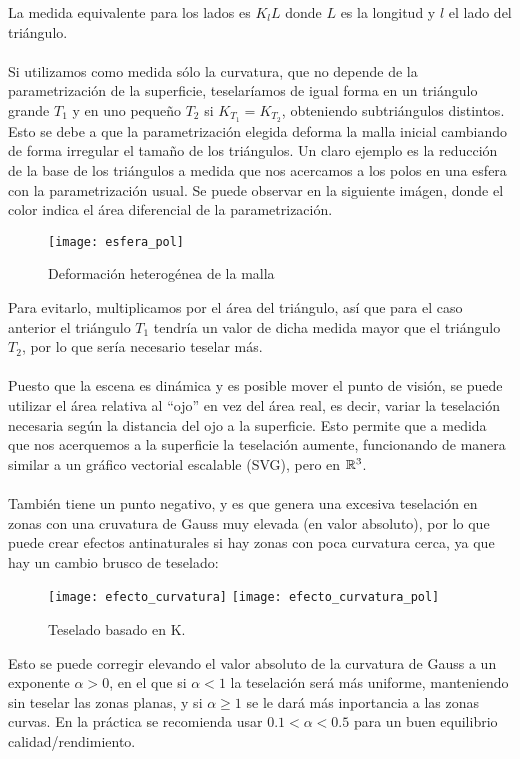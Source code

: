 	La medida equivalente para los lados es $K_l L$ donde $L$ es la longitud y $l$ el lado del triángulo.\\
	\\Si utilizamos como medida sólo la curvatura, que no depende de la parametrización de la superficie, teselaríamos de igual forma en un triángulo grande $T_1$ y en uno pequeño $T_2$ si $K_{T_1}=K_{T_2}$, obteniendo subtriángulos distintos. Esto se debe a que la parametrización elegida deforma la malla inicial cambiando de forma irregular el tamaño de los triángulos. Un claro ejemplo es la reducción de la base de los triángulos a medida que nos acercamos a los polos en una esfera con la parametrización usual. Se puede observar en la siguiente imágen, donde el color indica el área diferencial de la parametrización.\\
	\begin{figure}[h]
  		\centering
  		\texttt{[image: esfera\_pol]}
  		\caption{Deformación heterogénea de la malla}
  		\label{fig:esfera_pol}
	\end{figure}
	\newpage
	Para evitarlo, multiplicamos por el área del triángulo, así que para el caso anterior el triángulo $T_1$ tendría un valor de dicha medida mayor que el triángulo $T_2$, por lo que sería necesario teselar más.\\
	\\Puesto que la escena es dinámica y es posible mover el punto de visión, se puede utilizar el área relativa al ``ojo'' en vez del área real, es decir, variar la teselación necesaria según la distancia del ojo a la superficie. Esto permite que a medida que nos acerquemos a la superficie la teselación aumente, funcionando de manera similar a un gráfico vectorial escalable (SVG), pero en $\mathbb{R}^3$.\\
	\\También tiene un punto negativo, y es que genera una excesiva teselación en zonas con una cruvatura de Gauss muy elevada (en valor absoluto), por lo que puede crear efectos antinaturales si hay zonas con poca curvatura cerca, ya que hay un cambio brusco de teselado:\\
	\begin{figure}[h]
  		\centering
  		\texttt{[image: efecto\_curvatura]}
  		\texttt{[image: efecto\_curvatura\_pol]}
		\caption{Teselado basado en K.}
  		\label{fig:efecto_curvatura}
	\end{figure}
\newpage
Esto se puede corregir elevando el valor absoluto de la curvatura de Gauss a un exponente $\alpha>0$, en el que si $\alpha<1$ la teselación será más uniforme, manteniendo sin teselar las zonas planas, y si $\alpha\geq1$ se le dará más inportancia a las zonas curvas. En la práctica se recomienda usar $0.1<\alpha<0.5$ para un buen equilibrio calidad/rendimiento.\\
